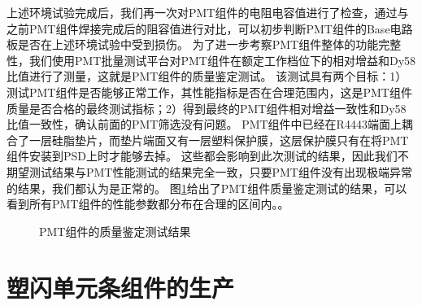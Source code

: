上述环境试验完成后，我们再一次对PMT组件的电阻电容值进行了检查，通过与之前PMT组件焊接完成后的阻容值进行对比，可以初步判断PMT组件的Base电路板是否在上述环境试验中受到损伤。
为了进一步考察PMT组件整体的功能完整性，我们使用PMT批量测试平台对PMT组件在额定工作档位下的相对增益和Dy58比值进行了测量，这就是PMT组件的质量鉴定测试。
该测试具有两个目标：1）测试PMT组件是否能够正常工作，其性能指标是否在合理范围内，这是PMT组件质量是否合格的最终测试指标；2）得到最终的PMT组件相对增益一致性和Dy58比值一致性，确认前面的PMT筛选没有问题。
PMT组件中已经在R4443端面上耦合了一层硅脂垫片，而垫片端面又有一层塑料保护膜，这层保护膜只有在将PMT组件安装到PSD上时才能够去掉。
这些都会影响到此次测试的结果，因此我们不期望测试结果与PMT性能测试的结果完全一致，只要PMT组件没有出现极端异常的结果，我们都认为是正常的。
图\ref{fig:construction:qualification_result}给出了PMT组件质量鉴定测试的结果，可以看到所有PMT组件的性能参数都分布在合理的区间内。。
\begin{figure}[htb]
\centering
{}
{}
\caption{PMT组件的质量鉴定测试结果}
\label{fig:construction:qualification_result}
\end{figure}

\section{塑闪单元条组件的生产}
\label{sec:construction:bar_production}

